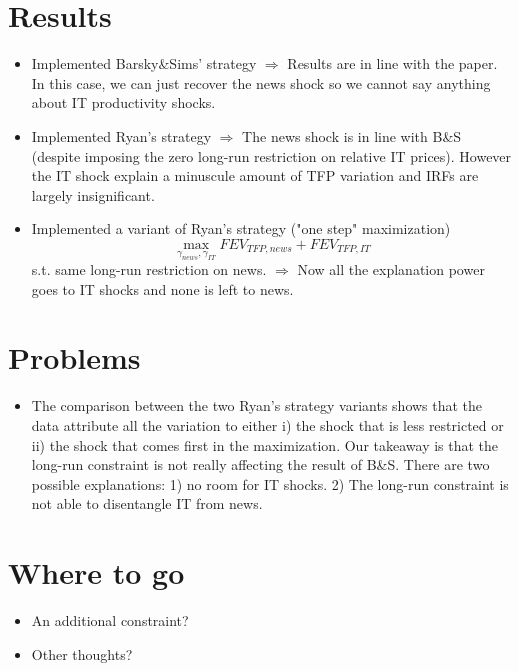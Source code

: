\documentclass{article}
\begin{document}
\Large{

\section*{Results}

\begin{itemize}
	\item Implemented Barsky\&Sims' strategy $\Rightarrow$ Results are in line with the paper. In this case, we can just recover the news shock so we cannot say anything about IT productivity shocks.
	\item Implemented Ryan's strategy $\Rightarrow$ The news shock is in line with B\&S (despite imposing the zero long-run restriction on relative IT prices). However the IT shock explain a minuscule amount of TFP variation and IRFs are largely insignificant.
	\item Implemented a variant of Ryan's strategy ("one step" maximization)
	$$
	\max_{\gamma_{news},\gamma_{IT}} FEV_{TFP,news} + FEV_{TFP,IT}
	$$ s.t. same long-run restriction on news. $\Rightarrow$ Now all the explanation power goes to IT shocks and none is left to news. 
\end{itemize}

\section*{Problems}

\begin{itemize}
	\item The comparison between the two Ryan's strategy variants shows that the data attribute all the variation to either i) the shock that is less restricted or ii) the shock that comes first in the maximization. Our takeaway is that the long-run constraint is not really affecting the result of B\&S. There are two possible explanations: 1) no room for IT shocks. 2) The long-run constraint is not able to disentangle IT from news.
\end{itemize}

\section*{Where to go}

\begin{itemize}
\item An additional constraint? 

\item Other thoughts?
\end{itemize}

}
\end{document}
